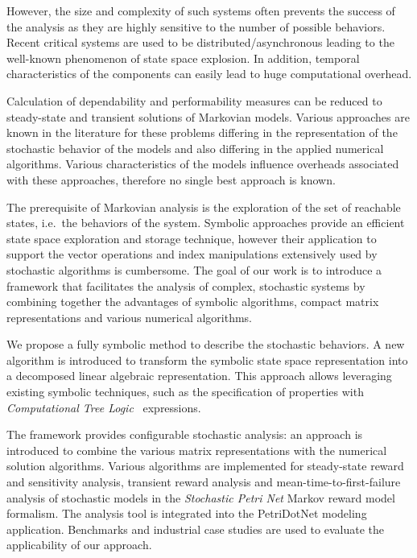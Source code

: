 However, the size and complexity of such systems often prevents the
success of the analysis as they are highly sensitive to the number of
possible behaviors. Recent critical systems are used to be
distributed/asynchronous leading to the well-known phenomenon of state
space explosion. In addition, temporal characteristics of the
components can easily lead to huge computational overhead.

Calculation of dependability and performability measures can be
reduced to steady-state and transient solutions of Markovian
models. Various approaches are known in the literature for these
problems differing in the representation of the stochastic behavior
of the models and also differing in the applied numerical
algorithms. Various characteristics of the models influence overheads
associated with these approaches, therefore no single best approach is
known.

The prerequisite of Markovian analysis is the exploration of the set
of reachable states, i.e.~the behaviors of the system. Symbolic
approaches provide an efficient state space exploration and storage
technique, however their application to support the vector operations
and index manipulations extensively used by stochastic algorithms is
cumbersome.  The goal of our work is to introduce a framework that
facilitates the analysis of complex, stochastic systems by combining
together the advantages of symbolic algorithms, compact matrix
representations and various numerical algorithms.

We propose a fully symbolic method to describe the stochastic
behaviors. A new algorithm is introduced to transform the symbolic
state space representation into a decomposed linear algebraic
representation. This approach allows leveraging existing symbolic
techniques, such as the specification of properties with
\emph{Computational Tree Logic}~ expressions.

The framework provides configurable stochastic analysis: an approach
is introduced to combine the various matrix representations with the
numerical solution algorithms. Various algorithms are implemented for
steady-state reward and sensitivity analysis, transient reward
analysis and mean-time-to-first-failure analysis of stochastic models
in the \emph{Stochastic Petri Net}  Markov reward
model formalism. The analysis tool is integrated into the PetriDotNet
modeling application.  Benchmarks and industrial case studies are used
to evaluate the applicability of our approach.
